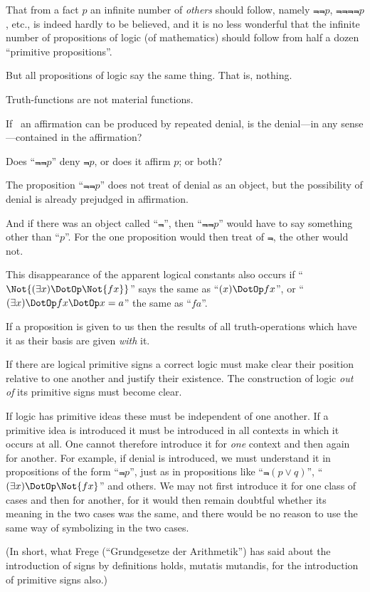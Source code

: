 {That from a fact $p$ an infinite number of \emph{others}
should follow, namely $\Not{\Not{p}}$, $\Not{\Not{\Not{\Not{p}}}}$, etc., is
indeed hardly to be believed, and it is no less
wonderful that the infinite number of propositions
of logic (of mathematics) should follow from half
a dozen ``primitive propositions''.

But all propositions of logic say the same thing.
That is, nothing.}


{Truth-functions are not material functions.

If \exempliGratia\ an affirmation can be produced by
repeated denial, is the denial---in any sense---contained
in the affirmation?

Does ``$\Not{\Not{p}}$'' deny $\Not{p}$, or does it affirm $p$;
or both?

The proposition ``$\Not{\Not{p}}$'' does not treat of
denial as an object, but the possibility of denial is
already prejudged in affirmation.

And if there was an object called ``$\Not{}$'', then
``$\Not{\Not{p}}$'' would have to say something other than
``$p$''. For the one proposition would then treat
of $\Not{}$, the other would not.}


{This disappearance of the apparent logical
constants also occurs if ``$\Not{(\exists x) \DotOp \Not{fx}}$'' says the
same as ``$(x) \DotOp fx$'', or ``$(\exists x) \DotOp fx \DotOp x = a$'' the same
as ``$fa$''.}


{If a proposition is given to us then the results
of all truth-operations which have it as their basis
are given \emph{with} it.}


{If there are logical primitive signs a correct logic
must make clear their position relative to one
another and justify their existence. The construction
of logic \emph{out of} its primitive signs must become
clear.}


{If logic has primitive ideas these must be
independent of one another. If a primitive idea
is introduced it must be introduced in all contexts
in which it occurs at all. One cannot therefore
introduce it for \emph{one} context and then again for
another. For example, if denial is introduced,
we must understand it in propositions of the form
``$\Not{p}$'', just as in propositions like ``$\Not{(p \lor q)}$'',
``$(\exists x) \DotOp \Not{fx}$'' and others. We may not first
introduce it for one class of cases and then for
another, for it would then remain doubtful whether
its meaning in the two cases was the same, and
there would be no reason to use the same way of
symbolizing in the two cases.

(In short, what Frege (``Grundgesetze der
Arithmetik'') has said about the introduction of
signs by definitions holds, mutatis mutandis, for
the introduction of primitive signs also.)}


